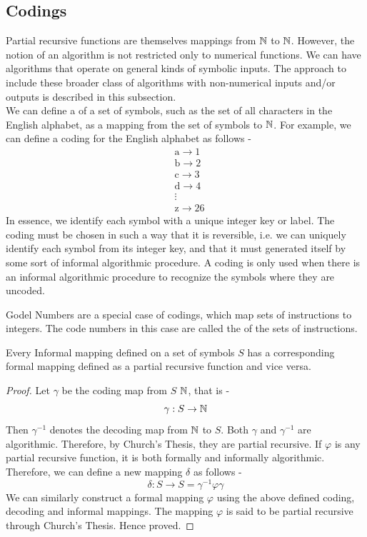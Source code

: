 \documentclass[openany]{book}
\begin{document}
\subsection{Codings}
Partial recursive functions are themselves mappings from $\mathbb{N}$ to $\mathbb{N}$. However, the notion of an algorithm is not restricted only to numerical functions. We can have algorithms that operate on general kinds of symbolic inputs. The approach to include these broader class of algorithms with non-numerical inputs and/or outputs is described in this subsection. \\
We can define a  of a set of symbols, such as the set of all characters in the English alphabet, as a mapping from the set of symbols to $\mathbb{N}$. For example, we can define a coding for the English alphabet as follows -
\begin{align*}
    &\text{a} \rightarrow 1 \\
    &\text{b} \rightarrow 2 \\
    &\text{c} \rightarrow 3 \\
    &\text{d} \rightarrow 4 \\
    &\vdots \\
    &\text{z} \rightarrow 26
\end{align*}
In essence, we identify each symbol with a unique integer key or label. The coding must be chosen in such a way that it is reversible, i.e. we can uniquely identify each symbol from its integer key, and that it must generated itself by some sort of informal algorithmic procedure. A coding is only used when there is an informal algorithmic procedure to recognize the symbols where they are uncoded. \\
\begin{mynote}
    Godel Numbers are a special case of codings, which map sets of instructions to integers. The code numbers in this case are called the  of the sets of instructions.
\end{mynote}
\begin{mytheorem}
    Every Informal mapping defined on a set of symbols $S$ has a corresponding formal mapping defined as a partial recursive function and vice versa. 
\end{mytheorem}
\begin{proof}
    Let $\gamma$ be the coding map from $S$  $\mathbb{N}$, that is - 
    $$\gamma: S \rightarrow \mathbb{N}$$
    Then $\gamma^{-1}$ denotes the decoding map from $\mathbb{N}$ to $S$. Both $\gamma$ and $\gamma^{-1}$ are algorithmic. Therefore, by Church's Thesis, they are partial recursive. If $\varphi$ is any partial recursive function, it is both formally and informally algorithmic. Therefore, we can define a new mapping $\delta$ as follows - 
    $$\delta: S \rightarrow S = \gamma^{-1}\varphi\gamma$$
    We can similarly construct a formal mapping $\varphi$ using the above defined coding, decoding and informal mappings. The mapping $\varphi$ is said to be partial recursive through Church's Thesis. Hence proved. 
\end{proof}
\end{document}
